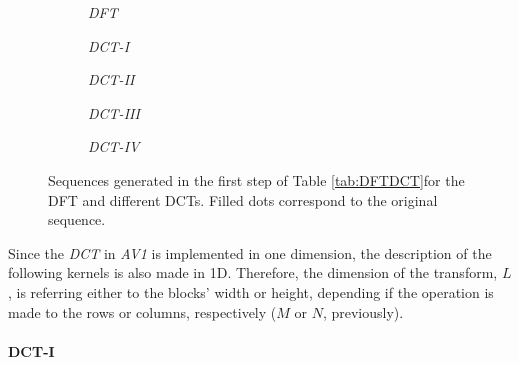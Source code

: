 \begin{figure}[!htpb]
    \centering 
        \begin{subfigure}[c]{\textwidth}
            \centering
            
            \caption{\emph{DFT}}
            \label{subfig:dft}
        \end{subfigure}
        \begin{subfigure}[c]{0.45\textwidth}
            \centering
            
            \caption{\emph{DCT-I}}
            \label{subfig:dct1}
        \end{subfigure}
        \begin{subfigure}[c]{0.45\textwidth}
            \centering
            
            \caption{\emph{DCT-II}}
            \label{subfig:dct2}
        \end{subfigure}
        \begin{subfigure}[c]{0.45\textwidth}
            \centering
            
            \caption{\emph{DCT-III}}
            \label{subfig:dct3}
        \end{subfigure}
        \begin{subfigure}[c]{0.45\textwidth}
            \centering
            
            \caption{\emph{DCT-IV}}
            \label{subfig:dct4}
        \end{subfigure}
        \caption{Sequences generated in the first step of Table \ref{tab:DFTDCT}for the DFT and different DCTs. Filled dots correspond to the original sequence.}
    \label{fig:2NSeq}
\end{figure}


Since the \emph{DCT} in \emph{AV1} is implemented in one dimension, the description of the following kernels is also made in 1D. Therefore, the dimension of the transform, $L$, is referring either to the blocks' width or height, depending if the operation is made to the rows or columns, respectively ($M$ or $N$, previously).

\paragraph{DCT-I}

